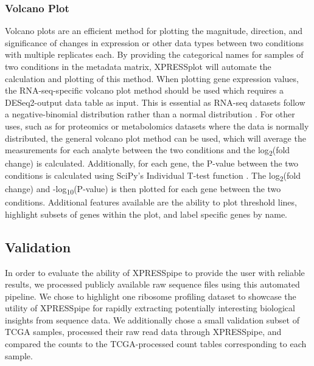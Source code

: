 \documentclass[10pt, oneside]{article}
\begin{document}
\subsubsection{Volcano Plot}
Volcano plots are an efficient method for plotting the magnitude, direction, and significance of changes in expression or other data types between two conditions with multiple replicates each. By providing the categorical names for samples of two conditions in the metadata matrix, XPRESSplot will automate the calculation and plotting of this method. When plotting gene expression values, the RNA-seq-specific volcano plot method should be used which requires a DESeq2-output data table as input. This is essential as RNA-seq datasets follow a negative-binomial distribution rather than a normal distribution \cite{deseq2}. For other uses, such as for proteomics or metabolomics datasets where the data is normally distributed, the general volcano plot method can be used, which will average the  measurements for each analyte between the two conditions and the log\textsubscript{2}(fold change) is calculated. Additionally, for each gene, the P-value between the two conditions is calculated using SciPy's Individual T-test function \cite{scipy}. The log\textsubscript{2}(fold change) and -log\textsubscript{10}(P-value) is then plotted for each gene between the two conditions. Additional features available are the ability to plot threshold lines, highlight subsets of genes within the plot, and label specific genes by name.



\subsection{Validation}
In order to evaluate the ability of XPRESSpipe to provide the user with reliable results, we processed publicly available raw sequence files using this automated pipeline. We chose to highlight one ribosome profiling dataset to showcase the utility of XPRESSpipe for rapidly extracting potentially interesting biological insights from sequence data. We additionally chose a small validation subset of TCGA samples, processed their raw read data through XPRESSpipe, and compared the counts to the TCGA-processed count tables corresponding to each sample.
\end{document}
